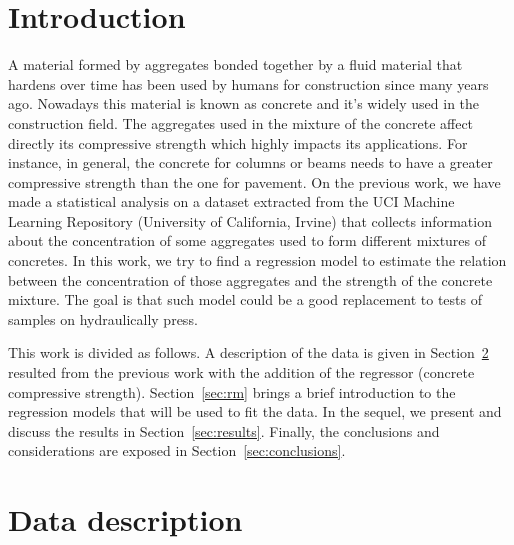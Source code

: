\documentclass[conference]{IEEEtran}
\begin{document}
\section{Introduction}
A material formed by aggregates bonded together by a fluid material that hardens over time has been used by humans for construction since many years ago\cite{b3}. Nowadays this material is known as concrete and it's widely used in the construction field. The aggregates used in the mixture of the concrete affect directly its compressive strength which highly impacts its applications. For instance, in general, the concrete for columns or beams needs to have a greater compressive strength than the one for pavement. On the previous work, we have made a statistical analysis on a dataset extracted from the UCI Machine Learning Repository (University of California, Irvine)\cite{b4} that collects information about the concentration of some aggregates used to form different mixtures of concretes. In this work, we try to find a regression model to estimate the relation between the concentration of those aggregates and the strength of the concrete mixture. The goal is that such model could be a good replacement to tests of samples on hydraulically press.

This work is divided as follows. A description of the data is given in Section~\ref{sec:data_description} resulted from the previous work with the addition of the regressor (concrete compressive strength). Section~\ref{sec:rm} brings a brief introduction to the regression models that will be used to fit the data. In the sequel, we present and discuss the results in Section~\ref{sec:results}. Finally, the conclusions and considerations are exposed in Section~\ref{sec:conclusions}.


\section{Data description}\label{sec:data_description}
\end{document}
